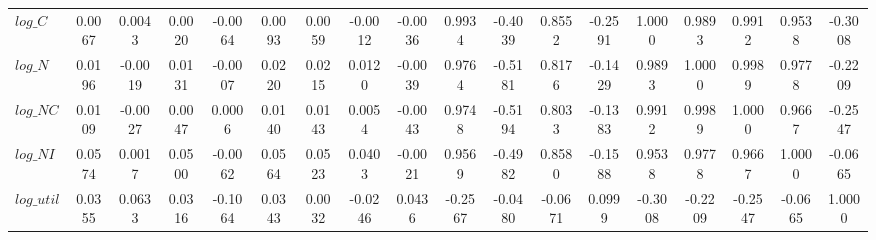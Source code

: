 \begin{center}
\begin{longtable}{lccccccccccccccccc}
$log\_C     $	 & 	       0.0067	 & 	       0.0043	 & 	       0.0020	 & 	      -0.0064	 & 	       0.0093	 & 	       0.0059	 & 	      -0.0012	 & 	      -0.0036	 & 	       0.9934	 & 	      -0.4039	 & 	       0.8552	 & 	      -0.2591	 & 	       1.0000	 & 	       0.9893	 & 	       0.9912	 & 	       0.9538	 & 	      -0.3008 \\ 
$log\_N     $	 & 	       0.0196	 & 	      -0.0019	 & 	       0.0131	 & 	      -0.0007	 & 	       0.0220	 & 	       0.0215	 & 	       0.0120	 & 	      -0.0039	 & 	       0.9764	 & 	      -0.5181	 & 	       0.8176	 & 	      -0.1429	 & 	       0.9893	 & 	       1.0000	 & 	       0.9989	 & 	       0.9778	 & 	      -0.2209 \\ 
$log\_NC    $	 & 	       0.0109	 & 	      -0.0027	 & 	       0.0047	 & 	       0.0006	 & 	       0.0140	 & 	       0.0143	 & 	       0.0054	 & 	      -0.0043	 & 	       0.9748	 & 	      -0.5194	 & 	       0.8033	 & 	      -0.1383	 & 	       0.9912	 & 	       0.9989	 & 	       1.0000	 & 	       0.9667	 & 	      -0.2547 \\ 
$log\_NI    $	 & 	       0.0574	 & 	       0.0017	 & 	       0.0500	 & 	      -0.0062	 & 	       0.0564	 & 	       0.0523	 & 	       0.0403	 & 	      -0.0021	 & 	       0.9569	 & 	      -0.4982	 & 	       0.8580	 & 	      -0.1588	 & 	       0.9538	 & 	       0.9778	 & 	       0.9667	 & 	       1.0000	 & 	      -0.0665 \\ 
$log\_util  $	 & 	       0.0355	 & 	       0.0633	 & 	       0.0316	 & 	      -0.1064	 & 	       0.0343	 & 	       0.0032	 & 	      -0.0246	 & 	       0.0436	 & 	      -0.2567	 & 	      -0.0480	 & 	      -0.0671	 & 	       0.0999	 & 	      -0.3008	 & 	      -0.2209	 & 	      -0.2547	 & 	      -0.0665	 & 	       1.0000 \\ 
\end{longtable}
 \end{center}
